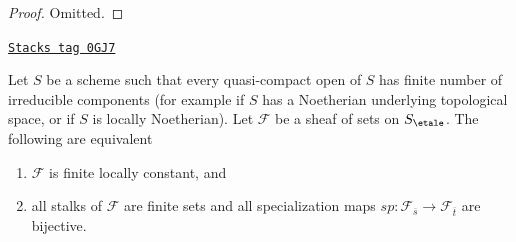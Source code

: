 \begin{proof}
Omitted.
\end{proof}

\begin{lemma}
\label{etale-cohomology-lemma-characterize-locally-constant}
\href{https://stacks.math.columbia.edu/tag/0GJ7}{\texttt{Stacks tag 0GJ7}}

Let $S$ be a scheme such that every quasi-compact open of $S$ has
finite number of irreducible components (for example if $S$ has a
Noetherian underlying topological space, or if $S$ is locally Noetherian).
Let $\mathcal{F}$ be a sheaf of sets on $S_\etale$.
The following are equivalent
\begin{enumerate}
\item $\mathcal{F}$ is finite locally constant, and
\item all stalks of $\mathcal{F}$ are finite sets and all specialization maps
$sp : \mathcal{F}_{\overline{s}} \to \mathcal{F}_{\overline{t}}$
are bijective.
\end{enumerate}
\end{lemma}

